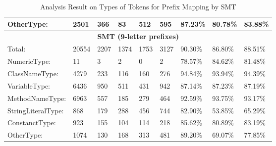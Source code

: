 \begin{table}[]
\begin{tabular}{|l|l|l|l|l|l|l|l|l|}
OtherType:         & 2501    & 366       & 83   & 512  & 595  & 87.23\%   & 80.78\% & 83.88\% \\ \hline
\multicolumn{9}{|c|}{\textbf{SMT (9-letter prefixes)}}                                        \\ \hline
Total:             & 20554   & 2207      & 1374 & 1753 & 3127 & 90.30\%   & 86.80\% & 88.51\% \\ \hline
NumericType:       & 11      & 3         & 2    & 0    & 2    & 78.57\%   & 84.62\% & 81.48\% \\ \hline
ClassNameType:     & 4279    & 233       & 116  & 160  & 276  & 94.84\%   & 93.94\% & 94.39\% \\ \hline
VariableType:      & 6436    & 950       & 511  & 431  & 942  & 87.14\%   & 87.23\% & 87.19\% \\ \hline
MethodNameType:    & 6963    & 557       & 185  & 279  & 464  & 92.59\%   & 93.75\% & 93.17\% \\ \hline
StringLiteralType: & 868     & 179       & 288  & 456  & 744  & 82.90\%   & 53.85\% & 65.29\% \\ \hline
ConstanctType:     & 923     & 155       & 104  & 114  & 218  & 85.62\%   & 80.89\% & 83.19\% \\ \hline
OtherType:         & 1074    & 130       & 168  & 313  & 481  & 89.20\%   & 69.07\% & 77.85\% \\ \hline
\end{tabular}
\caption{Analysis Result on Types of Tokens for Prefix Mapping by SMT}
\label{tblAnaTypeTokensSMT}
\end{table}

